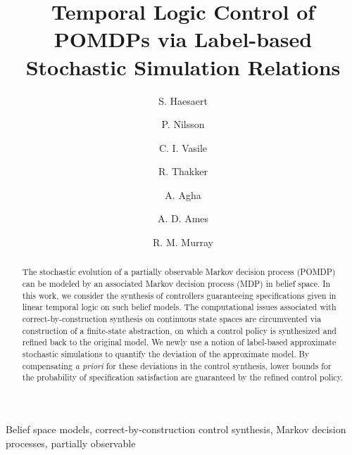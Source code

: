 \documentclass{ifacconf}
\begin{document}
\begin{frontmatter}

\title{Temporal Logic Control of POMDPs via Label-based Stochastic Simulation Relations}

\author[cal]{S. Haesaert}
\author[cal]{P. Nilsson}
\author[mit]{C. I. Vasile}
\author[jpl]{R. Thakker}
\author[jpl]{A. Agha}
\author[cal]{A. D.  Ames}
\author[cal]{R. M. Murray}



\address[cal]{California Institute of Technology,
   Pasadena, CA 91125 USA} %
\address[mit]{Massachusetts Institute of Technology,
   Cambridge, MA 02139 USA}%
\address[jpl]{Jet Propulsion Laboratory,
   Pasadena, CA 91109 USA}%
\maketitle
\begin{abstract}
The stochastic evolution of a partially observable Markov decision process (POMDP) can be modeled by an associated Markov decision process (MDP) in belief space.
In this work, we consider the synthesis of controllers guaranteeing  specifications given in linear temporal logic on such belief models. The computational issues associated with correct-by-construction synthesis on continuous state spaces are circumvented via construction of a finite-state abstraction, on which a control policy is synthesized and refined back to the original model. We newly use  a  notion of label-based approximate stochastic simulations to quantify the deviation of the approximate model. By compensating {\it a priori} for these deviations in the control synthesis, lower bounds for the probability of specification satisfaction are guaranteed by the refined control policy.
\end{abstract}
\begin{keyword} Belief space models,
correct-by-construction control synthesis, Markov decision processes, partially observable
\end{keyword}

\end{frontmatter}
\end{document}
